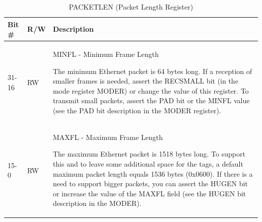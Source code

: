 \begin{xltabular}{\textwidth}{|l|l|X|}
  
  \hline
  {\bf Bit \#} & {\bf R/W} & {\bf Description} \\ \hline \hline
  \endfirsthead
  \hline
  \caption{PACKETLEN (Packet Length Register)}
  \endlastfoot

  31-16   & RW  & MINFL - Minimum Frame Length 

              The minimum Ethernet packet is 64 bytes long. If a reception of
              smaller frames is needed, assert the RECSMALL bit (in the mode
              register MODER) or change the value of this register. To
              transmit small packets, assert the PAD bit or the MINFL value
              (see the PAD bit description in the MODER register). \\* \nobreakhline
  15-0   & RW  & MAXFL - Maximum Frame Length 

              The maximum Ethernet packet is 1518 bytes long. To support this
              and to leave some additional space for the tags, a default
              maximum packet length equals 1536 bytes (0x0600). If there is a
              need to support bigger packets, you can assert the HUGEN bit or
              increase the value of the MAXFL field (see the HUGEN bit
              description in the MODER).\\
\end{xltabular}
\label{csr_details:packetlen}

